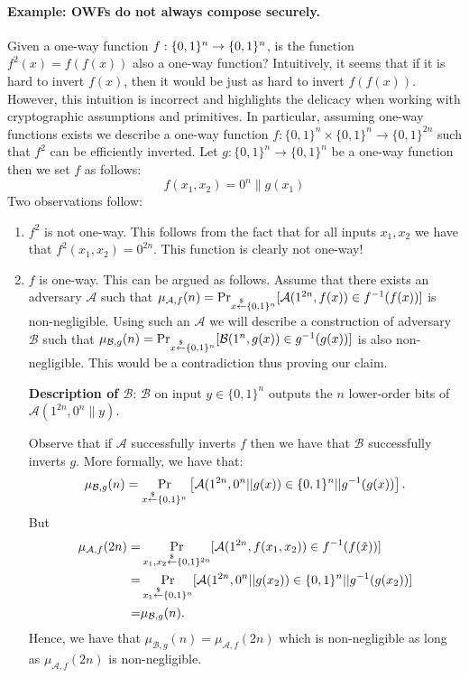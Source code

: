 \paragraph{Example: OWFs do not always compose securely.}
Given a one-way function $f : \{0,1\}^{n}\rightarrow\{0,1\}^{n}$, is the function $f^2(x) = f(f(x))$ also a one-way function?  Intuitively, it seems that if it is hard to invert $f(x)$, then it would be just as hard to invert $f(f(x))$. 
However, this intuition is incorrect and highlights the delicacy when working with cryptographic assumptions and primitives. In particular, assuming one-way functions exists we describe a one-way function $f: \{0,1\}^{n}\times \{0,1\}^{n} \rightarrow \{0,1\}^{2n}$ such that $f^2$ can be efficiently inverted.
Let $g: \{0,1\}^n \rightarrow \{0,1\}^n$ be a one-way function then we set $f$ as follows:
$$f(x_1,x_2) = 0^{n}\|g(x_1)$$
Two observations follow:
\begin{enumerate} 
  \item $f^2$ is not one-way. This follows from the fact that for all inputs $x_1, x_2$ we have that $f^2(x_1,x_2) = 0^{2n}$. This function is clearly not one-way!
  \item $f$ is one-way. This can be argued as follows. Assume that there exists an adversary $\mathcal{A}$ such that $\mu_{\mathcal{A},f}(n) = \Pr_{x \stackrel{\$}{\leftarrow} \{0,1\}^{n}}[ \mathcal{A}(1^{2n}, f(x)) \in f^{-1}(f(x))]$ is non-negligible. Using such an $\mathcal{A}$ we will describe a construction of adversary $\mathcal{B}$ such that $\allowbreak\mu_{\mathcal{B},g}(n) = \Pr_{x \stackrel{\$}{\leftarrow} \{0,1\}^{n}}[ \mathcal{B}(1^n, g(x)) \in g^{-1}(g(x))]$ is also non-negligible. This would be a contradiction thus proving our claim.

      \textbf{Description of $\mathcal{B}$}: $\mathcal{B}$ on input $y \in\{0,1\}^n$ outputs the $n$ lower-order bits of  $\mathcal{A}(1^{2n}, 0^{n}\|y)$.

      Observe that if $\mathcal{A}$ successfully inverts $f$ then we have that $\mathcal{B}$ successfully inverts $g$. More formally, we have that:
      $$\mu_{\mathcal{B},g}(n) = \Pr_{x \stackrel{\$}{\leftarrow} \{0,1\}^{n}}\left[ \mathcal{A}(1^{2n}, 0^n || g(x)) \in \{0,1\}^n || g^{-1}(g(x))\right].$$
      But
      \begin{align*}
      \mu_{\mathcal{A},f}(2n) =& \Pr_{x_1, x_2 \stackrel{\$}{\leftarrow} \{0,1\}^{2n}}[ \mathcal{A}(1^{2n}, f(x_1, x_2)) \in f^{-1}(f(\tilde x))]\\
      = & \Pr_{x_1 \stackrel{\$}{\leftarrow} \{0,1\}^{n}}[ \mathcal{A}(1^{2n}, 0^n || g(x_2)) \in \{0,1\}^n || g^{-1}(g(x_2))] \\
      = & \mu_{\mathcal{B},g}(n).
      \end{align*}
      Hence, we have that $\mu_{\mathcal{B},g}(n) = \mu_{\mathcal{A},f}(2n)$ which is non-negligible as long as $\mu_{\mathcal{A},f}(2n)$  is non-negligible.
\end{enumerate}



